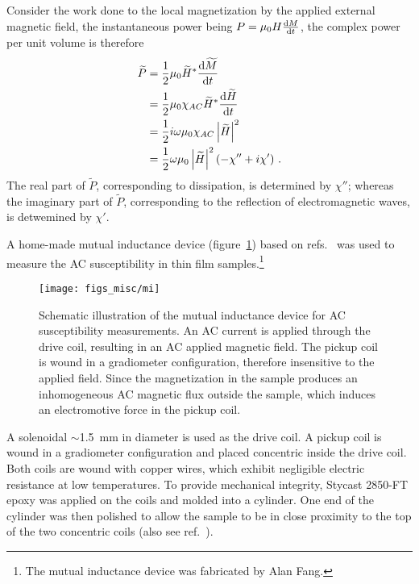Consider the work done to the local magnetization by the applied external magnetic field, the instantaneous power being $P = \mu_0H\frac{\mathop{}\!\mathrm{d} M}{\mathop{}\!\mathrm{d} t}$, the complex power per unit volume is therefore%
\begin{align}%
    \widetilde{P} &= \frac{1}{2}\mu_0 \widetilde{H}^* \frac{\diff \widetilde{M}}{\diff t}\nonumber\\
        &= \frac{1}{2}\mu_0\chi_{AC}\widetilde{H}^*\frac{\diff \widetilde{H}}{\diff t}\nonumber\\
        &= \frac{1}{2}i\omega\mu_0\chi_{AC}\left|\widetilde{H}\right|^2\nonumber\\
        &= \frac{1}{2}\omega\mu_0\left|\widetilde{H}\right|^2(-\chi''+i\chi')\label{eq:acm_power}~.
\end{align}%
The real part of $\widetilde{P}$, corresponding to dissipation, is determined by $\chi''$; whereas the imaginary part of $\widetilde{P}$, corresponding to the reflection of electromagnetic waves, is detwemined by $\chi'$.

A home-made mutual inductance device (figure~\ref{fig:mi_sketch}) based on refs.~\cite{Jeanneret1989} was used to measure the AC susceptibility in thin film samples.\footnote{The mutual inductance device was fabricated by Alan Fang.} %
\begin{figure}[ht]%
	\centering%
    \texttt{[image: figs\_misc/mi]}%
    \caption[Schematic illustration of the mutual inductance device for AC susceptibility measurements]{\label{fig:mi_sketch}Schematic illustration of the mutual inductance device for AC susceptibility measurements. An AC current is applied through the drive coil, resulting in an AC applied magnetic field. The pickup coil is wound in a gradiometer configuration, therefore insensitive to the applied field. Since the magnetization in the sample produces an inhomogeneous AC magnetic flux outside the sample, which induces an electromotive force in the pickup coil.}%
\end{figure}%
%
A solenoidal $\sim$\SI{1.5}{mm} in diameter is used as the drive coil. A pickup coil is wound in a gradiometer configuration and placed concentric inside the drive coil. Both coils are wound with copper wires, which exhibit negligible electric resistance at low temperatures. To provide mechanical integrity, Stycast 2850-FT epoxy was applied on the coils and molded into a cylinder. One end of the cylinder was then polished to allow the sample to be in close proximity to the top of the two concentric coils (also see ref.~\cite{YazdaniThesis}).

